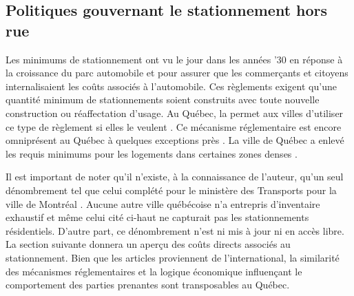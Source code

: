   \subsection{Politiques gouvernant le stationnement hors rue}\label{sec:intro-requis-minimums}
    Les minimums de stationnement ont vu le jour dans les années '30  en réponse à la croissance du parc automobile et pour assurer que les commerçants et citoyens internalisaient les coûts associés à l'automobile\parencite{shoup_high_2005}. Ces règlements exigent qu'une quantité minimum de stationnements soient construits avec toute nouvelle construction ou réaffectation d'usage. Au Québec, la \fg{}  permet aux villes d'utiliser ce type de règlement si elles le veulent \parencite{editeur_officiel_du_quebec_loi_1979}. Ce mécanisme réglementaire est encore omniprésent au Québec à quelques exceptions près \parencite{aignel_elaboration_2015,arrondissement_cote-des-neiges_ville_de_montreal_reglement_2020,arrondissement_sud-ouest_ville_de_montreal_reglement_2020,arrondissement_ville-marie_ville_de_montreal_reglement_2018,arrondissement_plateau_mont-royal_ville_de_montreal_reglement_2015}. La ville de Québec a enlevé les requis minimums pour les logements dans certaines zones denses \parencite{ville_de_quebec_rvq_2024}.\par
    Il est important de noter qu'il n'existe, à la connaissance de l'auteur, qu'un seul dénombrement tel que celui complété pour le ministère des Transports pour la ville de Montréal \parencite{consortium_cima_-_daniel_arbour_et_associes_inventaire_1998}. Aucune autre ville québécoise n'a entrepris d'inventaire exhaustif et même celui cité ci-haut ne capturait pas les stationnements résidentiels. D'autre part, ce dénombrement n'est ni mis à jour ni en accès libre. La section suivante donnera un aperçu des coûts directs associés au stationnement. Bien que les articles proviennent de l'international, la similarité des mécanismes réglementaires et la logique économique influençant le comportement des parties prenantes sont transposables au Québec. \par
